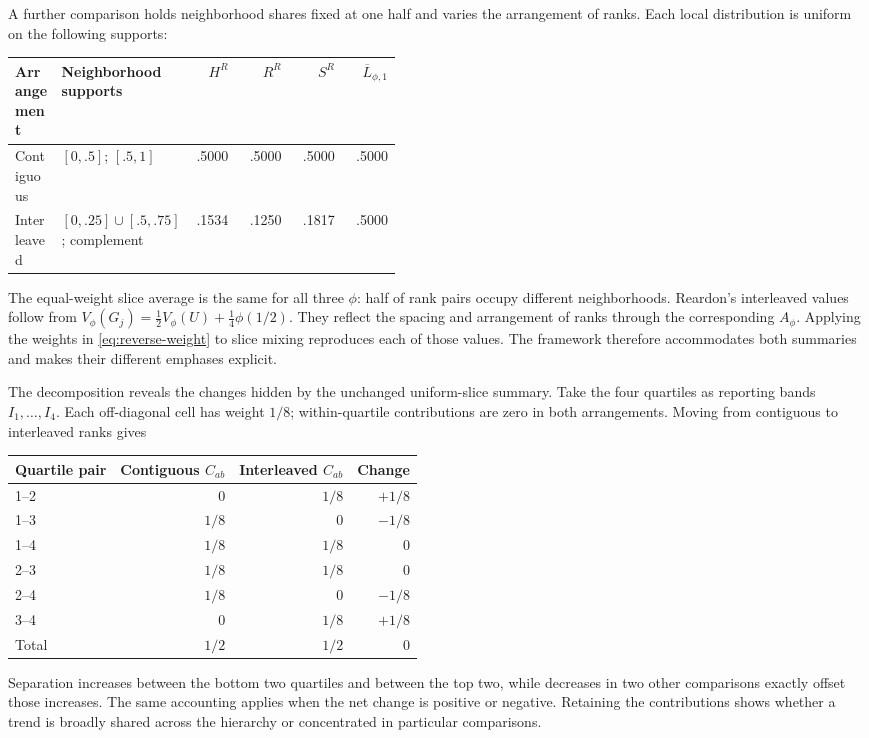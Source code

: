 \documentclass[11pt]{article}
\begin{document}
A further comparison holds neighborhood shares fixed at one half and varies the arrangement of ranks. Each local distribution is uniform on the following supports:
\begin{center}
\small
\begin{tabular}{p{0.12\linewidth}p{0.33\linewidth}rrrr}
\toprule
Arrangement & Neighborhood supports & $H^R$ & $R^R$ & $S^R$ & $\overline L_{\phi,1}$\\
\midrule
Contiguous & $[0,.5]$; $[.5,1]$ & .5000 & .5000 & .5000 & .5000\\
Interleaved & $[0,.25]\cup[.5,.75]$; complement & .1534 & .1250 & .1817 & .5000\\
\bottomrule
\end{tabular}
\end{center}
The equal-weight slice average is the same for all three $\phi$: half of rank pairs occupy different neighborhoods. Reardon's interleaved values follow from $V_\phi(G_j)=\tfrac12V_\phi(U)+\tfrac14\phi(1/2)$. They reflect the spacing and arrangement of ranks through the corresponding $A_\phi$. Applying the weights in \eqref{eq:reverse-weight} to slice mixing reproduces each of those values. The framework therefore accommodates both summaries and makes their different emphases explicit.

The decomposition reveals the changes hidden by the unchanged uniform-slice summary. Take the four quartiles as reporting bands $I_1,\ldots,I_4$. Each off-diagonal cell has weight $1/8$; within-quartile contributions are zero in both arrangements. Moving from contiguous to interleaved ranks gives
\begin{center}
\begin{tabular}{lrrr}
\toprule
Quartile pair & Contiguous $C_{ab}$ & Interleaved $C_{ab}$ & Change\\
\midrule
1--2 & 0 & $1/8$ & $+1/8$\\
1--3 & $1/8$ & 0 & $-1/8$\\
1--4 & $1/8$ & $1/8$ & 0\\
2--3 & $1/8$ & $1/8$ & 0\\
2--4 & $1/8$ & 0 & $-1/8$\\
3--4 & 0 & $1/8$ & $+1/8$\\
\midrule
Total & $1/2$ & $1/2$ & 0\\
\bottomrule
\end{tabular}
\end{center}
Separation increases between the bottom two quartiles and between the top two, while decreases in two other comparisons exactly offset those increases. The same accounting applies when the net change is positive or negative. Retaining the contributions shows whether a trend is broadly shared across the hierarchy or concentrated in particular comparisons.
\end{document}
